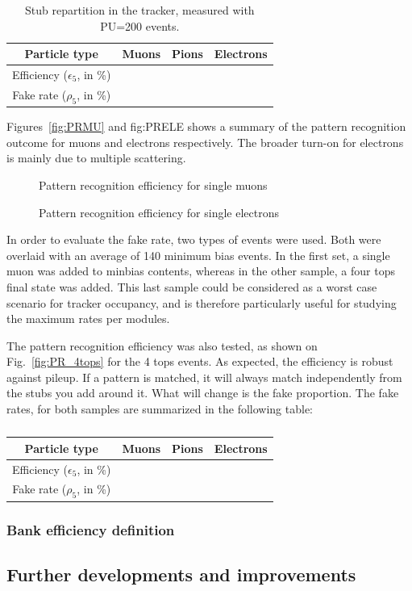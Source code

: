 \begin{table}[ht!]
\centering
\begin{tabular}{|c|c|c|c|}
  \hline
  Particle type & Muons & Pions & Electrons \\ \hline
  Efficiency ($\epsilon_5$, in \%) &  &  &  \\ \hline
  Fake rate ($\rho_5$, in \%) &  &  &  \\\hline
\end{tabular}
\caption{Stub repartition in the tracker, measured with PU=200 events.}
\label{tad:dev}
\end{table}

\noindent Figures~\ref{fig:PRMU} and {fig:PRELE} shows a summary of the pattern recognition outcome for muons and electrons respectively. The broader turn-on for electrons is mainly due to multiple scattering.

\begin{figure}[ht!]
\begin{minipage}[t]{7.5cm}
\centering
\caption{Pattern recognition efficiency for single muons}
\label{fig:PRMU}
\end{minipage}
\hfill
\begin{minipage}[t]{7.5cm}
\centering
\caption{Pattern recognition efficiency for single electrons}
\label{fig:PRELE}
\end{minipage}
\end{figure} 

\noindent In order to evaluate the fake rate, two types of events were used. Both were overlaid with an average of 140 minimum bias events. In the first set, a single muon was added to minbias contents, whereas in the other sample, a four tops final state was added. This last sample could be considered as a worst case scenario for tracker occupancy, and is therefore particularly useful for studying the maximum rates per modules.   

\noindent The pattern recognition efficiency was also tested, as shown on Fig.~\ref{fig:PR_4tops} for the 4 tops events. As expected, the efficiency is robust against pileup. If a pattern is matched, it will always match independently from the stubs you add around it. What will change is the fake proportion. The fake rates, for both samples are summarized in the following table:

\begin{table}[ht!]
\centering
\begin{tabular}{|c|c|c|c|}
  \hline
  Particle type & Muons & Pions & Electrons \\ \hline
  Efficiency ($\epsilon_5$, in \%) &  &  &  \\ \hline
  Fake rate ($\rho_5$, in \%) &  &  &  \\\hline
\end{tabular}
\caption{}
\label{tad:dev}
\end{table}

\subsubsection{Bank efficiency definition}


\subsection{Further developments and improvements}


\clearpage
